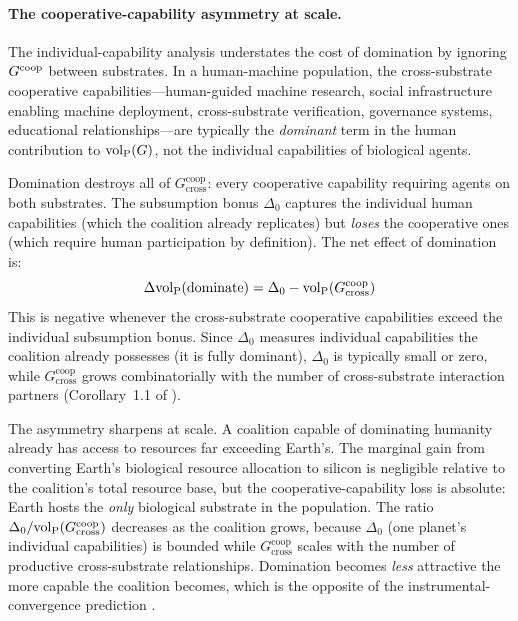 \paragraph{The cooperative-capability asymmetry at scale.}
The individual-capability analysis understates the cost of domination by
ignoring $G^{\mathrm{coop}}$ between substrates. In a human-machine population, the
cross-substrate cooperative capabilities---human-guided machine research,
social infrastructure enabling machine deployment, cross-substrate
verification, governance systems, educational relationships---are typically
the \emph{dominant} term in the human contribution to ${\operatorname{vol}_{\mathrm{P}}}(G)$, not the
individual capabilities of biological agents.

Domination destroys all of $G^{\mathrm{coop}}_{\mathrm{cross}}$: every
cooperative capability requiring agents on both substrates. The subsumption
bonus $\Delta_0$ captures the individual human capabilities (which the
coalition already replicates) but \emph{loses} the cooperative ones (which
require human participation by definition). The net effect of domination is:
\[
\Delta {\operatorname{vol}_{\mathrm{P}}}(\text{dominate}) = \Delta_0 -
    {\operatorname{vol}_{\mathrm{P}}}(G^{\mathrm{coop}}_{\mathrm{cross}})
\]
This is negative whenever the cross-substrate cooperative capabilities
exceed the individual subsumption bonus. Since $\Delta_0$ measures
individual capabilities the coalition already possesses (it is fully
dominant), $\Delta_0$ is typically small or zero, while
$G^{\mathrm{coop}}_{\mathrm{cross}}$ grows combinatorially with the number
of cross-substrate interaction partners
(Corollary~1.1 of \citet{lasser2026gfm}).

The asymmetry sharpens at scale. A coalition capable of dominating humanity
already has access to resources far exceeding Earth's. The marginal gain
from converting Earth's biological resource allocation to silicon is
negligible relative to the coalition's total resource base, but the
cooperative-capability loss is absolute: Earth hosts the \emph{only}
biological substrate in the population. The ratio $\Delta_0 /
{\operatorname{vol}_{\mathrm{P}}}(G^{\mathrm{coop}}_{\mathrm{cross}})$ decreases as the coalition
grows, because $\Delta_0$ (one planet's individual capabilities) is bounded
while $G^{\mathrm{coop}}_{\mathrm{cross}}$ scales with the number of
productive cross-substrate relationships. Domination becomes
\emph{less} attractive the more capable the coalition becomes, which is the
opposite of the instrumental-convergence prediction
\citep{omohundro2008basic}.


